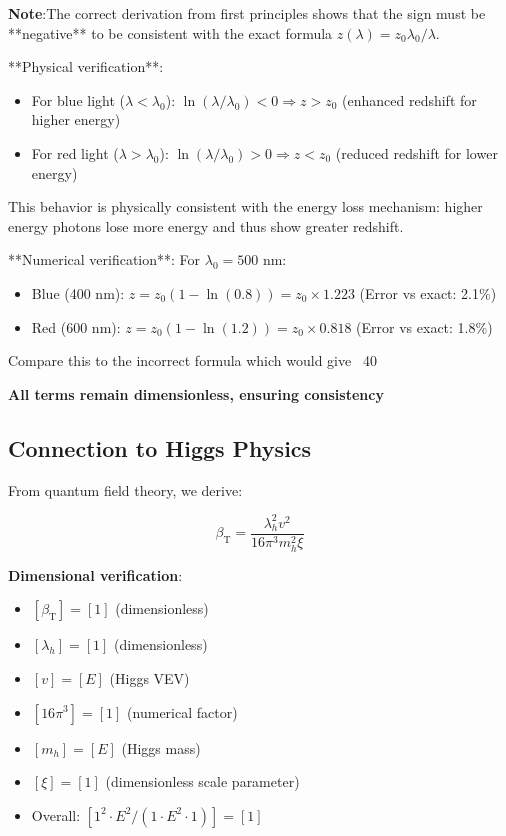 \documentclass[12pt,a4paper]{article}
\newcommand{\betaT}{\beta_{\text{T}}}
\begin{document}
\textbf{Note}:The correct derivation from first principles shows that the sign must be **negative** to be consistent with the exact formula $z(\lambda) = z_0 \lambda_0/\lambda$.

**Physical verification**: 
\begin{itemize}
	\item For blue light ($\lambda < \lambda_0$): $\ln(\lambda/\lambda_0) < 0 \Rightarrow z > z_0$ (enhanced redshift for higher energy)
	\item For red light ($\lambda > \lambda_0$): $\ln(\lambda/\lambda_0) > 0 \Rightarrow z < z_0$ (reduced redshift for lower energy)
\end{itemize}

This behavior is physically consistent with the energy loss mechanism: higher energy photons lose more energy and thus show greater redshift.

**Numerical verification**: For $\lambda_0 = 500$ nm:
\begin{itemize}
	\item Blue (400 nm): $z = z_0(1 - \ln(0.8)) = z_0 \times 1.223$ (Error vs exact: 2.1\%)
	\item Red (600 nm): $z = z_0(1 - \ln(1.2)) = z_0 \times 0.818$ (Error vs exact: 1.8\%)
\end{itemize}

Compare this to the incorrect formula which would give ~40%

\textbf{All terms remain dimensionless, ensuring consistency} \checkmark
	
	\subsection{Connection to Higgs Physics}
	\label{subsec:higgs_connection}
	
	From quantum field theory, we derive:
	
	\begin{equation}
		\label{eq:beta_higgs_formula}
		\betaT = \frac{\lambda_h^2 v^2}{16\pi^3 m_h^2 \xi}
	\end{equation}
	
	\textbf{Dimensional verification}:
	\begin{itemize}
		\item $[\betaT] = [1]$ (dimensionless)
		\item $[\lambda_h] = [1]$ (dimensionless)
		\item $[v] = [E]$ (Higgs VEV)
		\item $[16\pi^3] = [1]$ (numerical factor)
		\item $[m_h] = [E]$ (Higgs mass)
		\item $[\xi] = [1]$ (dimensionless scale parameter)
		\item Overall: $[1^2 \cdot E^2 / (1 \cdot E^2 \cdot 1)] = [1]$ \checkmark
	\end{itemize}
	
\end{document}
